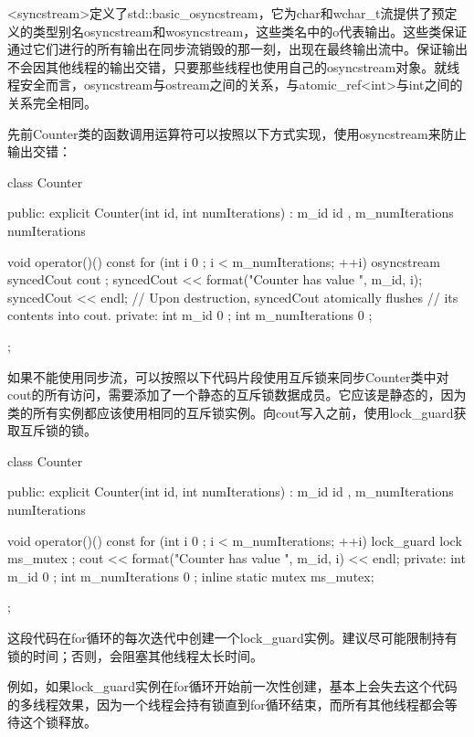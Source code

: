 
<syncstream>定义了std::basic\_osyncstream，它为char和wchar\_t流提供了预定义的类型别名osyncstream和wosyncstream，这些类名中的o代表输出。这些类保证通过它们进行的所有输出在同步流销毁的那一刻，出现在最终输出流中。保证输出不会因其他线程的输出交错，只要那些线程也使用自己的osyncstream对象。就线程安全而言，osyncstream与ostream之间的关系，与atomic\_ref<int>与int之间的关系完全相同。

先前Counter类的函数调用运算符可以按照以下方式实现，使用osyncstream来防止输出交错：

\begin{cpp}
class Counter
{
    public:
        explicit Counter(int id, int numIterations)
            : m_id { id }, m_numIterations { numIterations } { }

        void operator()() const
        {
            for (int i { 0 }; i < m_numIterations; ++i) {
                osyncstream syncedCout { cout };
                syncedCout << format("Counter {} has value {}", m_id, i);
                syncedCout << endl;
                // Upon destruction, syncedCout atomically flushes
                // its contents into cout.
            }
        }
    private:
        int m_id { 0 };
        int m_numIterations { 0 };
};
\end{cpp}


如果不能使用同步流，可以按照以下代码片段使用互斥锁来同步Counter类中对cout的所有访问，需要添加了一个静态的互斥锁数据成员。它应该是静态的，因为类的所有实例都应该使用相同的互斥锁实例。向cout写入之前，使用lock\_guard获取互斥锁的锁。

\begin{cpp}
class Counter
{
    public:
        explicit Counter(int id, int numIterations)
            : m_id { id }, m_numIterations { numIterations } { }

        void operator()() const
        {
            for (int i { 0 }; i < m_numIterations; ++i) {
                lock_guard lock { ms_mutex };
                cout << format("Counter {} has value {}", m_id, i) << endl;
            }
        }
    private:
        int m_id { 0 };
        int m_numIterations { 0 };
        inline static mutex ms_mutex;
};
\end{cpp}

这段代码在for循环的每次迭代中创建一个lock\_guard实例。建议尽可能限制持有锁的时间；否则，会阻塞其他线程太长时间。

例如，如果lock\_guard实例在for循环开始前一次性创建，基本上会失去这个代码的多线程效果，因为一个线程会持有锁直到for循环结束，而所有其他线程都会等待这个锁释放。

